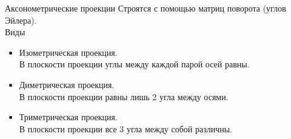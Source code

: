 \documentclass{beamer}
\begin{document}
	\begin{frame}{Аксонометрические проекции}
		Строятся с помощью матриц поворота (углов Эйлера).
		\\ Виды
		\begin{itemize}
			\item Изометрическая проекция. \\
			В плоскости проекции углы между каждой парой осей равны.
			\item Диметрическая проекция. \\
			В плоскости проекции равны лишь 2 угла между осями.
			\item Триметрическая проекция. \\
			В плоскости проекции все 3 угла между собой различны.
		\end{itemize}
	\end{frame}
	
\end{document}
